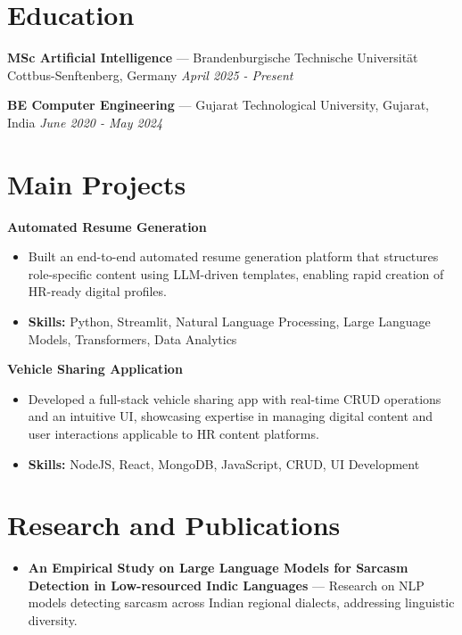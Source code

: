 \documentclass[a4paper,10pt]{article}
\begin{document}
\section*{Education}
\textbf{MSc Artificial Intelligence} — Brandenburgische Technische Universität Cottbus-Senftenberg, Germany \hfill \textit{April 2025 - Present}\par
\vspace{1.5pt}
\textbf{BE Computer Engineering} — Gujarat Technological University, Gujarat, India \hfill \textit{June 2020 - May 2024}\par

\section*{Main Projects}
\textbf{Automated Resume Generation}\par
\vspace{1pt}
\begin{itemize}
  \item Built an end-to-end automated resume generation platform that structures role-specific content using LLM-driven templates, enabling rapid creation of HR-ready digital profiles.
  \item \textbf{Skills:} Python, Streamlit, Natural Language Processing, Large Language Models, Transformers, Data Analytics
\end{itemize}
\vspace{3pt}
\textbf{Vehicle Sharing Application}\par
\vspace{1pt}
\begin{itemize}
  \item Developed a full-stack vehicle sharing app with real-time CRUD operations and an intuitive UI, showcasing expertise in managing digital content and user interactions applicable to HR content platforms.
  \item \textbf{Skills:} NodeJS, React, MongoDB, JavaScript, CRUD, UI Development
\end{itemize}

\section*{Research and Publications}
\begin{itemize}
\item \textbf{An Empirical Study on Large Language Models for Sarcasm Detection in Low-resourced Indic Languages} — Research on NLP models detecting sarcasm across Indian regional dialects, addressing linguistic diversity.
\end{itemize}
\end{document}
